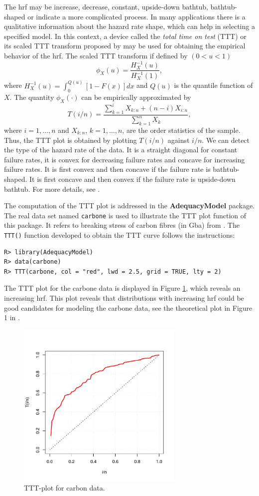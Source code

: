 \documentclass[10pt,letterpaper]{article}
\begin{document}
The hrf may be increase, decrease, constant, upside-down bathtub, bathtub-shaped or indicate a more complicated process. In many applications there is a qualitative information about the hazard rate shape, which can help in selecting a specified model. In this context, a device called the {\it total time on test} (TTT) or its scaled TTT transform proposed by \cite{aarset1987} may be used for obtaining the empirical behavior of the hrf. The scaled TTT transform if defined by $(0 < u < 1)$ $$\phi_X(u) = \frac{H^{-1}_{X}(u)}{H^{-1}_{X}(1)},$$
where $H^{-1}_{X}(u) = \int_{0}^{Q(u)}[1-F(x)]dx$ and $Q(u)$ is the quantile function of $X$. The quantity $\phi_X(\cdot)$ can be empirically approximated by
$$T(i/n) = \frac{\sum_{k=1}^i X_{k:n} + (n - i)X_{i:n}}{\sum_{k=1}^n X_{k}},$$
where $i = 1, \ldots, n$ and $X_{k:n}$, $k=1,\ldots,n$, are the order statistics of the sample. Thus, the TTT plot is obtained by plotting $T(i/n)$ against $i/n$. We can detect the type of the hazard rate of the data. It is a straight diagonal for constant failure rates, it is convex for decreasing failure rates and concave for increasing failure rates. It is first convex and then concave if the failure rate is bathtub-shaped. It is first concave and then convex if the failure rate is upside-down bathtub. For more details, see \cite{aarset1987}.

The computation of the TTT plot is addressed in the \textbf{AdequacyModel} package. The real data set named \texttt{carbone} is used to illustrate 
the TTT plot function of this package. It refers to breaking stress of carbon fibres (in Gba) from \cite{nicholspadgett2006}.
The \texttt{TTT()} function developed to obtain the TTT curve follows the instructions:
\begin{verbatim}
R> library(AdequacyModel)
R> data(carbone)
R> TTT(carbone, col = "red", lwd = 2.5, grid = TRUE, lty = 2)
\end{verbatim}
The TTT plot for the carbone data \cite{nicholspadgett2006} is displayed in Figure \ref{tttplot}, which reveals an increasing hrf.  
This plot reveals that distributions with increasing hrf could be good candidates for modeling the carbone data, see the theoretical 
plot in Figure 1 in \cite{aarset1987}.
\begin{figure}[H]
	\centering
	\includegraphics[width=8cm,height=8cm]{tttplot}
	\caption{TTT-plot for carbon data.}
	\label{tttplot}
\end{figure}
\end{document}
